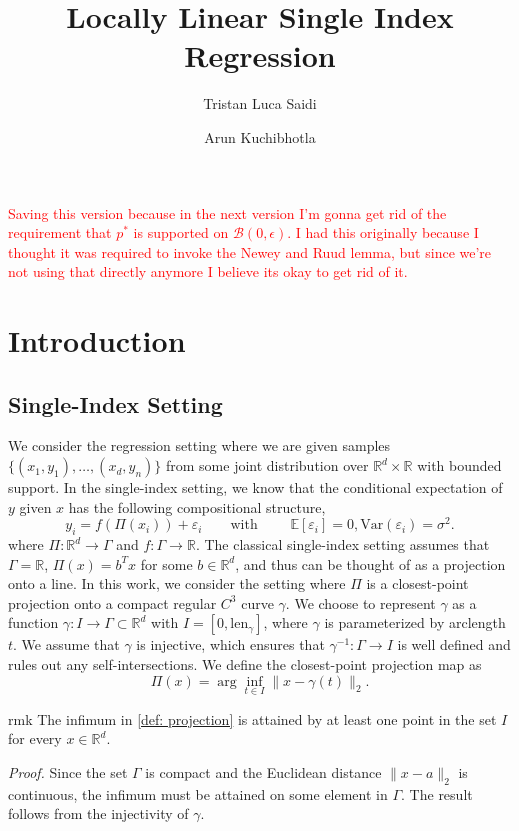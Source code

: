\documentclass[11pt]{article}
\title{Locally Linear Single Index Regression}
\author{Tristan Luca Saidi}
\author{Arun Kuchibhotla}
\affil[1]{Department of Statistics and Data Science, Carnegie Mellon University}
\begin{document}
\maketitle

\textcolor{red}{Saving this version because in the next version I'm gonna get rid of the requirement that $p^*$ is supported on $\mathcal{B}(0, \epsilon)$. I had this originally because I thought it was required to invoke the Newey and Ruud lemma, but since we're not using that directly anymore I believe its okay to get rid of it.}

\section{Introduction}
\subsection{Single-Index Setting}
We consider the regression setting where we are given samples $\{(x_1, y_1), \dots, (x_d, y_n)\}$ from some joint distribution over $\mathbb{R}^d\times \mathbb{R}$ with bounded support. In the single-index setting, we know that the conditional expectation of $y$ given $x$ has the following compositional structure,
\[y_i = f(\Pi(x_i)) + \varepsilon_i \qquad \text{with } \qquad \mathbb{E}[\varepsilon_i] = 0, \text{Var}(\varepsilon_i) = \sigma^2.\]
where $\Pi:\mathbb{R}^d \rightarrow \Gamma$ and $f: \Gamma\rightarrow\mathbb{R}$. The classical single-index setting assumes that $\Gamma = \mathbb{R}$, $\Pi(x) = b^{T}x$ for some $b \in \mathbb{R}^d$, and thus can be thought of as a projection onto a line. In this work, we consider the setting where $\Pi$ is a closest-point projection onto a compact regular $C^3$ curve $\gamma$. We choose to represent $\gamma$ as a function $\gamma:I \rightarrow \Gamma \subset \mathbb{R}^d$ with $I = [0,\text{len}_{\gamma}]$, where $\gamma$ is parameterized by arclength $t$. We assume that $\gamma$ is injective, which ensures that $\gamma^{-1}:\Gamma\rightarrow I$ is well defined and rules out any self-intersections. We define the closest-point projection map as
\begin{equation}\label{def: projection}
\Pi(x) = \arg\inf_{t\in I}\|x - \gamma(t)\|_2.
\end{equation}
\begin{restatable}{rmk}{} \label{remark: infimum}
    The infimum in \cref{def: projection} is attained by at least one point in the set $I$ for every $x \in \mathbb{R}^d$.
\end{restatable}
\noindent \textit{Proof.} Since the set $\Gamma$ is compact and the Euclidean distance $\|x-a\|_2$ is continuous, the infimum must be attained on some element in $\Gamma$. The result follows from the injectivity of $\gamma$. 
\end{document}
